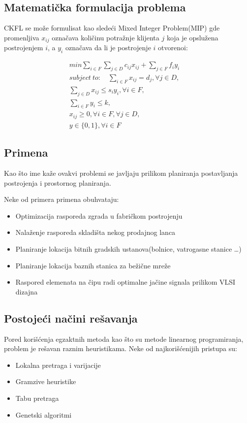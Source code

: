 \documentclass[a4paper]{article}
\begin{document}
\subsection{Matematička formulacija problema}
CKFL se može formulisat kao sledeći Mixed Integer Problem(MIP) gde promenljiva $x_{ij}$ označava količinu potražnje klijenta $j$ koja je opslužena postrojenjem $i$, a $y_i$ označava da li je postrojenje $i$ otvorenoi\cite{original}:

\begin{align}
min \sum_{i \in F}\sum_{j \in D}c_{ij}x_{ij} + \sum_{j \in F}f_iy_i\\
 subject\: to: 
\quad \sum_{i \in F}x_{ij} = d_j, \forall j \in D,\quad\\
 \sum_{j \in D}x_{ij} \le s_iy_i, \forall i \in F,\\
\sum_{i \in F}y_i \le k,\\
x_{ij} \ge 0, \forall i \in F,\forall j \in D,\\
y \in \{ 0 , 1 \}, \forall i \in F
\end{align}

\subsection{Primena}

Kao što ime kaže ovakvi problemi se javljaju prilikom planiranja postavljanja postrojenja i prostornog planiranja.

Neke od primera primena obuhvataju\cite{tokyo}:
\begin{itemize}
\item  Optimizacija rasporeda zgrada u fabričkom postrojenju
\item Nalaženje rasporeda skladišta nekog prodajnog lanca
\item Planiranje lokacija bitnih gradskih ustanova(bolnice, vatrogasne stanice \ldots)
\item Planiranje lokacija baznih stanica za bežične mreže
\item Raspored elemenata na čipu radi optimalne jačine signala prilikom VLSI dizajna
\end{itemize}

\subsection{Postojeći načini rešavanja}

Pored korišćenja egzaktnih metoda kao što su metode linearnog programiranja, problem je rešavan raznim heuristikama. Neke od najkorišćenijih pristupa su\cite{Silva}:
\begin{itemize}
\item Lokalna pretraga i varijacije
\item Gramzive heuristike
\item Tabu pretraga
\item Genetski algoritmi
\end{itemize}
\end{document}
